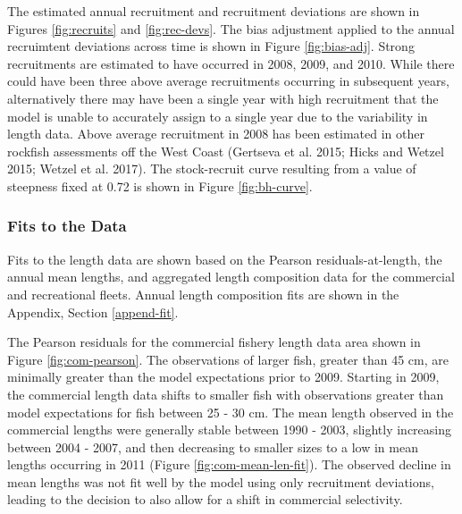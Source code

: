 \documentclass[11pt,
  english,
  a4paper,
]{article}
\begin{document}

The estimated annual recruitment and recruitment deviations are shown in Figures \ref{fig:recruits} and \ref{fig:rec-devs}. The bias adjustment applied to the annual recruimtent deviations across time is shown in Figure \ref{fig:bias-adj}. Strong recruitments are estimated to have occurred in 2008, 2009, and 2010. While there could have been three above average recruitments occurring in subsequent years, alternatively there may have been a single year with high recruitment that the model is unable to accurately assign to a single year due to the variability in length data. Above average recruitment in 2008 has been estimated in other rockfish assessments off the West Coast {(Gertseva et al. 2015; Hicks and Wetzel 2015; Wetzel et al. 2017)\leavevmode\tagmcend\tagstructend}. The stock-recruit curve resulting from a value of steepness fixed at 0.72 is shown in Figure \ref{fig:bh-curve}.

\leavevmode\tagmcend\tagstructend\par


\hypertarget{fits-to-the-data}{%
\subsubsection{Fits to the Data}\label{fits-to-the-data}}

\leavevmode\tagmcend\tagstructend


Fits to the length data are shown based on the Pearson residuals-at-length, the annual mean lengths, and aggregated length composition data for the commercial and recreational fleets. Annual length composition fits are shown in the Appendix, Section \ref{append-fit}.

\leavevmode\tagmcend\tagstructend\par


The Pearson residuals for the commercial fishery length data area shown in Figure \ref{fig:com-pearson}. The observations of larger fish, greater than 45 cm, are minimally greater than the model expectations prior to 2009. Starting in 2009, the commercial length data shifts to smaller fish with observations greater than model expectations for fish between 25 - 30 cm. The mean length observed in the commercial lengths were generally stable between 1990 - 2003, slightly increasing between 2004 - 2007, and then decreasing to smaller sizes to a low in mean lengths occurring in 2011 (Figure \ref{fig:com-mean-len-fit}). The observed decline in mean lengths was not fit well by the model using only recruitment deviations, leading to the decision to also allow for a shift in commercial selectivity.
\end{document}
